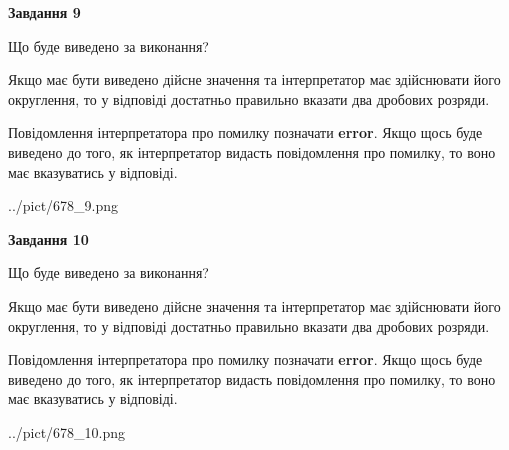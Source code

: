 \documentclass[12pt, ukrainian]{article}
\begin{document}
{\begin {Large}
{\begin {center}\textbf{Завдання 9}\end {center}}\par
Що буде виведено за виконання? \par

Якщо має бути виведено дійсне значення та інтерпретатор має здійснювати його округлення, 
то у відповіді достатньо правильно вказати два дробових розряди.

Повідомлення інтерпретатора про помилку позначати \textbf{error}.
Якщо щось буде виведено до того, як інтерпретатор видасть повідомлення про помилку, 
то воно має вказуватись у відповіді. \par

\begin{center}
	{../pict/678_9.png}
\end{center}
\newpage

{\begin {center}\textbf{Завдання 10}\end {center}}\par
Що буде виведено за виконання? \par

Якщо має бути виведено дійсне значення та інтерпретатор має здійснювати його округлення, 
то у відповіді достатньо правильно вказати два дробових розряди.

Повідомлення інтерпретатора про помилку позначати \textbf{error}.
Якщо щось буде виведено до того, як інтерпретатор видасть повідомлення про помилку, 
то воно має вказуватись у відповіді. \par

\begin{center}
	{../pict/678_10.png}
\end{center}
\newpage

\end {Large}}
\end{document}

